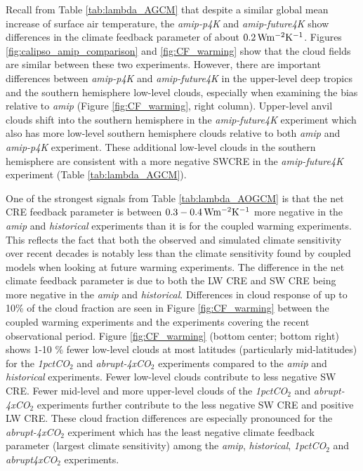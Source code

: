 \documentclass[draft]{agujournal2019}
\begin{document}
Recall from Table \ref{tab:lambda_AGCM} that despite a similar global mean increase of surface air temperature, the \textit{amip-p4K} and \textit{amip-future4K} show 
differences in the climate feedback parameter of about $0.2 \, \rm{W m^{-2} K^{-1}}$.  Figures  \ref{fig:calipso_amip_comparison} and \ref{fig:CF_warming} show that the cloud fields are similar between these two experiments.  However, there are important
differences between \textit{amip-p4K} and \textit{amip-future4K} in the upper-level deep tropics and the southern hemisphere low-level
clouds, especially when examining the bias relative to \textit{amip} (Figure \ref{fig:CF_warming}, right column).  
Upper-level anvil clouds shift into the southern hemisphere in the \textit{amip-future4K} experiment which also has more low-level southern 
hemisphere clouds relative to both \textit{amip} and  \textit{amip-p4K} experiment.  These additional low-level clouds in the southern hemisphere 
are consistent with a more negative SWCRE in the \textit{amip-future4K} experiment (Table  \ref{tab:lambda_AGCM}). 

One of the strongest signals from Table \ref{tab:lambda_AOGCM} is that the net CRE feedback parameter is between 
$0.3-0.4 \,  \rm{W m^{-2} K^{-1}}$ more negative in the \textit{amip} and \textit{historical} experiments than it is for the coupled 
warming experiments.  This reflects the fact that both the observed and simulated climate sensitivity over recent decades is 
notably less than the climate sensitivity found by coupled models when looking at future warming experiments.  
The difference in the net climate feedback parameter is due to both the LW CRE and SW CRE being more negative in the \textit{amip} and \textit{historical}.
Differences in cloud response of up to 10\% of the cloud fraction are seen in Figure  \ref{fig:CF_warming} between the coupled warming experiments and 
the experiments covering the recent observational period.    
Figure  \ref{fig:CF_warming} (bottom center; bottom right) shows 1-10 \% fewer low-level clouds at most latitudes (particularly mid-latitudes) for the 
\textit{1pctCO$_2$} and \textit{abrupt-4xCO$_2$} experiments compared to the \textit{amip} and \textit{historical} experiments.  
Fewer low-level clouds contribute to less negative SW CRE.  Fewer mid-level and more upper-level clouds of the \textit{1pctCO$_2$} and \textit{abrupt-4xCO$_2$} experiments further contribute 
to the less negative SW CRE and positive LW CRE.  These cloud fraction differences are especially pronounced for the \textit{abrupt-4xCO$_2$} 
experiment which has the least negative climate feedback parameter (largest climate sensitivity) among the \textit{amip}, \textit{historical}, 
\textit{1pctCO$_2$} and \textit{abrupt4xCO$_2$} experiments.  
\end{document}
